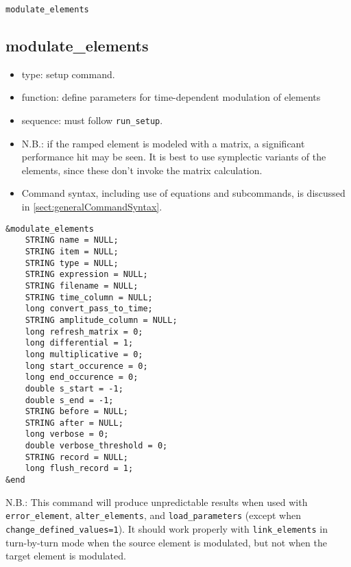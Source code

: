 \documentclass[11pt]{article}
\begin{document}
\newpage
\begin{center}{\Large\verb|modulate_elements|}\end{center}
\subsection{modulate\_elements\label{subsec:modulateelements}}

\begin{itemize}
\item type: setup command.
\item function: define parameters for time-dependent modulation of elements
\item sequence: must follow \verb|run_setup|.
\item N.B.: if the ramped element is modeled with a matrix, a significant performance hit may be seen.
  It is best to use symplectic variants of the elements, since these don't invoke the matrix calculation.
\item Command syntax, including use of equations and subcommands, is discussed in \ref{sect:generalCommandSyntax}.
\end{itemize}

\begin{verbatim}
&modulate_elements
    STRING name = NULL;
    STRING item = NULL;
    STRING type = NULL;
    STRING expression = NULL;
    STRING filename = NULL;
    STRING time_column = NULL;
    long convert_pass_to_time;
    STRING amplitude_column = NULL;
    long refresh_matrix = 0;
    long differential = 1;
    long multiplicative = 0;
    long start_occurence = 0;
    long end_occurence = 0;
    double s_start = -1;
    double s_end = -1;
    STRING before = NULL;
    STRING after = NULL;
    long verbose = 0;
    double verbose_threshold = 0;
    STRING record = NULL;
    long flush_record = 1;
&end
\end{verbatim}

N.B.: This command will produce unpredictable results when used with
\verb|error_element|, \verb|alter_elements|, and
\verb|load_parameters| (except when \verb|change_defined_values=1|).
It should work properly with \verb|link_elements| in turn-by-turn mode
when the source element is modulated, but not when the target element
is modulated.
\end{document}
